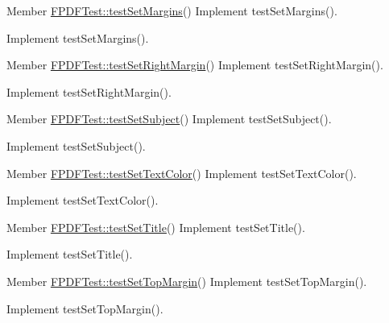 \begin{DoxyDescription}
\item[Member \hyperlink{class_f_p_d_f_test_a6865f0deae430866543f9cdf88d4843c}{FPDFTest::testSetMargins}() ]Implement testSetMargins().

Implement testSetMargins().
\end{DoxyDescription}

\label{todo__todo000155}
\hypertarget{todo__todo000155}{}
 
\begin{DoxyDescription}
\item[Member \hyperlink{class_f_p_d_f_test_aa3d7e46363f0f6c3a7ee5d336999aa47}{FPDFTest::testSetRightMargin}() ]Implement testSetRightMargin().

Implement testSetRightMargin().
\end{DoxyDescription}

\label{todo__todo000160}
\hypertarget{todo__todo000160}{}
 
\begin{DoxyDescription}
\item[Member \hyperlink{class_f_p_d_f_test_aabc48b3677f12ba2ed44aff54514cd64}{FPDFTest::testSetSubject}() ]Implement testSetSubject().

Implement testSetSubject().
\end{DoxyDescription}

\label{todo__todo000174}
\hypertarget{todo__todo000174}{}
 
\begin{DoxyDescription}
\item[Member \hyperlink{class_f_p_d_f_test_a91acaaf45bf68b9129756e7618de4683}{FPDFTest::testSetTextColor}() ]Implement testSetTextColor().

Implement testSetTextColor().
\end{DoxyDescription}

\label{todo__todo000159}
\hypertarget{todo__todo000159}{}
 
\begin{DoxyDescription}
\item[Member \hyperlink{class_f_p_d_f_test_a71aa9259f5ade449ddbe4e05316eff14}{FPDFTest::testSetTitle}() ]Implement testSetTitle().

Implement testSetTitle().
\end{DoxyDescription}

\label{todo__todo000154}
\hypertarget{todo__todo000154}{}
 
\begin{DoxyDescription}
\item[Member \hyperlink{class_f_p_d_f_test_abadbc3bb2d33de5cf0c683b6079381df}{FPDFTest::testSetTopMargin}() ]Implement testSetTopMargin().

Implement testSetTopMargin().
\end{DoxyDescription}

